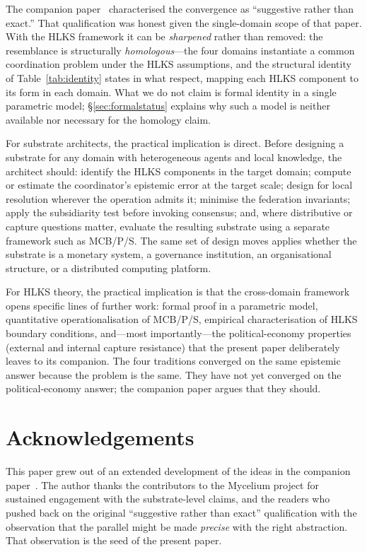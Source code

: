 \documentclass[11pt]{article}
\theoremstyle{definition}
\theoremstyle{plain}
\theoremstyle{plain}
\begin{document}
The companion paper~\cite{nicholson2026} characterised the convergence as
``suggestive rather than exact.'' That qualification was honest given the
single-domain scope of that paper. With the HLKS framework it can be
\emph{sharpened} rather than removed: the resemblance is structurally
\emph{homologous}---the four domains instantiate a common coordination problem
under the HLKS assumptions, and the structural identity of
Table~\ref{tab:identity} states in what respect, mapping each HLKS component to its
form in each domain. What we do not claim is formal identity in a single
parametric model; \S\ref{sec:formalstatus} explains why such a model is neither
available nor necessary for the homology claim.

For substrate architects, the practical implication is direct. Before
designing a substrate for any domain with heterogeneous agents and local
knowledge, the architect should: identify the HLKS components in the target
domain; compute or estimate the coordinator's epistemic error at the target
scale; design for local resolution wherever the operation admits it;
minimise the federation invariants; apply the subsidiarity test before
invoking consensus; and, where distributive or capture questions matter, evaluate
the resulting substrate using a separate framework such as MCB/P/S. The same set of
design moves applies whether the substrate is a
monetary system, a governance institution, an organisational structure, or
a distributed computing platform.

For HLKS theory, the practical implication is that the cross-domain
framework opens specific lines of further work: formal proof in a parametric
model, quantitative operationalisation of MCB/P/S, empirical
characterisation of HLKS boundary conditions, and---most importantly---the
political-economy properties (external and internal capture resistance) that
the present paper deliberately leaves to its companion. The four traditions
converged on the same epistemic answer because the problem is the same. They
have not yet converged on the political-economy answer; the companion paper
argues that they should.

\section*{Acknowledgements}

This paper grew out of an extended development of the ideas in the companion
paper~\cite{nicholson2026}. The author thanks the contributors to the
Mycelium project for sustained engagement with the substrate-level claims,
and the readers who pushed back on the original ``suggestive rather than
exact'' qualification with the observation that the parallel might be made
\emph{precise} with the right abstraction. That observation is the seed of the
present paper.


\end{document}
